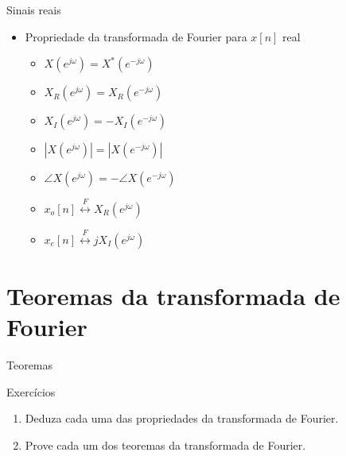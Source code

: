 \begin{slide}[toc=]{Sinais reais}
\begin{itemize}
   \item Propriedade da transformada de Fourier para $x[n]$ real
   \begin{itemize}
      \item $ X(e^{j\omega}) = X^*(e^{-j\omega})$
      \item $ X_R(e^{j\omega}) = X_R(e^{-j\omega})$
      \item $ X_I(e^{j\omega}) = -X_I(e^{-j\omega})$
      \item $ |X(e^{j\omega})| = |X(e^{-j\omega})|$
      \item $ \angle X(e^{j\omega}) = -\angle X(e^{-j\omega})$
      \item $ x_o[n] \stackrel{F}{\leftrightarrow} X_R(e^{j\omega})$
      \item $ x_e[n] \stackrel{F}{\leftrightarrow} jX_I(e^{j\omega})$
   \end{itemize}
\end{itemize}
\end{slide}

\section[slide=true]{Teoremas da transformada de Fourier}
\begin{slide}[toc=]{Teoremas}
\end{slide}

\begin{note}{Exercícios}
\begin{enumerate}
   \item Deduza cada uma das propriedades da transformada de Fourier.
   \item Prove cada um dos teoremas da transformada de Fourier. 
\end{enumerate}

\end{note}




